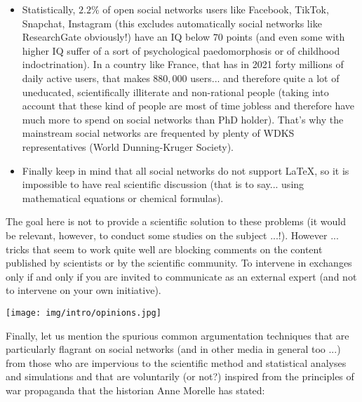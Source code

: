 \begin{itemize}
		\item Statistically, $2.2\%$ of open social networks users like Facebook, TikTok, Snapchat, Instagram (this excludes automatically social networks like ResearchGate obviously!) have an IQ below $70$ points (and even some with higher IQ suffer of a sort of psychological paedomorphosis or of childhood indoctrination). In a country like France, that has in 2021 forty millions of daily active users, that makes $880,000$ users... and therefore quite a lot of uneducated, scientifically illiterate and non-rational people (taking into account that these kind of people are most of time jobless and therefore have much more to spend on social networks than PhD holder). That's why the mainstream social networks are frequented by plenty of WDKS representatives (World Dunning-Kruger Society).
	
		\item Finally keep in mind that all social networks do not support \LaTeX{}, so it is impossible to have real scientific discussion (that is to say... using mathematical equations or chemical formulas).
	\end{itemize}
	The goal here is not to provide a scientific solution to these problems (it would be relevant, however, to conduct some studies on the subject ...!). However ... tricks that seem to work quite well are blocking comments on the content published by scientists or by the scientific community. To intervene in exchanges only if and only if you are invited to communicate as an external expert (and not to intervene on your own initiative).
	\begin{center}
		\texttt{[image: img/intro/opinions.jpg]}
	\end{center}	
	Finally, let us mention the spurious common argumentation techniques that are particularly flagrant on social networks (and in other media in general too ...) from those who are impervious to the scientific method and statistical analyses and simulations and that are voluntarily (or not?) inspired from the principles of war propaganda that the historian Anne Morelle has stated:
